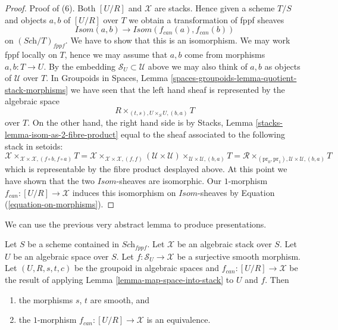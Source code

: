\begin{proof}
\medskip\noindent
Proof of (6). Both $[U/R]$ and $\mathcal{X}$ are stacks.
Hence given a scheme $T/S$ and objects $a, b$ of $[U/R]$
over $T$ we obtain a transformation of fppf sheaves
$$
\mathit{Isom}(a, b) \longrightarrow \mathit{Isom}(f_{can}(a), f_{can}(b))
$$
on $(\textit{Sch}/T)_{fppf}$. We have to show that this is an
isomorphism. We may work fppf locally on $T$, hence we may assume that
$a, b$ come from morphisms $a, b : T \to U$. By the embedding
$\mathcal{S}_U \subset \mathcal{U}$ above we may also think of $a, b$ as
objects of $\mathcal{U}$ over $T$. In
Groupoids in Spaces,
Lemma \ref{spaces-groupoids-lemma-quotient-stack-morphisms}
we have seen that the left hand sheaf is represented by the algebraic space
$$
R \times_{(t, s), U \times_S U, (b, a)} T
$$
over $T$. On the other hand, the right hand side is by
Stacks, Lemma \ref{stacks-lemma-isom-as-2-fibre-product}
equal to the sheaf associated to the following stack in setoids:
$$
\mathcal{X}
\times_{\mathcal{X} \times \mathcal{X}, (f \circ b, f \circ a)} T =
\mathcal{X}
\times_{\mathcal{X} \times \mathcal{X}, (f, f)}
(\mathcal{U} \times \mathcal{U})
\times_{\mathcal{U} \times \mathcal{U}, (b, a)} T =
\mathcal{R}
\times_{(\text{pr}_0, \text{pr}_1), \mathcal{U} \times \mathcal{U}, (b, a)} T
$$
which is representable by the fibre product desplayed above.
At this point we have shown that the two $\mathit{Isom}$-sheaves
are isomorphic. Our $1$-morphism $f_{can} : [U/R] \to \mathcal{X}$ induces
this isomorphism on $\mathit{Isom}$-sheaves by
Equation (\ref{equation-on-morphisms}).
\end{proof}

\noindent
We can use the previous very abstract lemma to produce
presentations.

\begin{lemma}
\label{lemma-space-presentation}
Let $S$ be a scheme contained in $\textit{Sch}_{fppf}$.
Let $\mathcal{X}$ be an algebraic stack over $S$.
Let $U$ be an algebraic space over $S$.
Let $f : \mathcal{S}_U \to \mathcal{X}$ be a surjective smooth morphism.
Let $(U, R, s, t, c)$ be the groupoid in algebraic spaces
and $f_{can} : [U/R] \to \mathcal{X}$ be the result of applying
Lemma \ref{lemma-map-space-into-stack}
to $U$ and $f$. Then
\begin{enumerate}
\item the morphisms $s$, $t$ are smooth, and
\item the $1$-morphism $f_{can} : [U/R] \to \mathcal{X}$
is an equivalence.
\end{enumerate}
\end{lemma}

